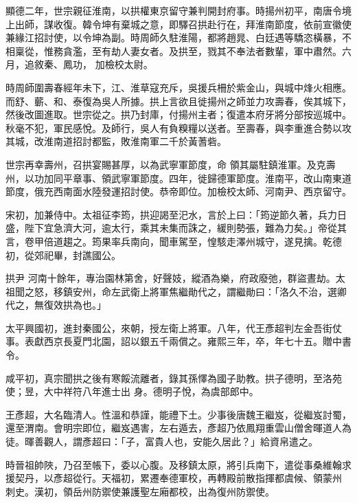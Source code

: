\begin{pinyinscope}
 顯德二年，世宗親征淮南，以拱權東京留守兼判開封府事。時揚州初平，南唐令境上出師，謀收復。韓令坤有棄城之意，即驛召拱赴行在，拜淮南節度，依前宣徽使兼緣江招討使，以令坤為副。時周師久駐淮陽，都將趙晁、白廷遇等驕恣橫暴，不相稟從，惟務貪濫，至有劫人妻女者。及拱至，戮其不奉法者數輩，軍中肅然。六月，追敘秦、鳳功，
 加檢校太尉。



 時周師圍壽春經年未下，江、淮草寇充斥，吳援兵柵於紫金山，與城中烽火相應。而舒、蘄、和、泰復為吳人所據。拱上言欲且徙揚州之師並力攻壽春，俟其城下，然後改圖進取。世宗從之。拱乃封庫，付揚州主者；復遣本府牙將分部按巡城中。秋毫不犯，軍民感悅。及師行，吳人有負糗糧以送者。至壽春，與李重進合勢以攻其城，改淮南道招討都監，敗淮南軍二千於黃蓍砦。



 世宗再幸壽州，召拱宴賜甚厚，以為武寧軍節度，命
 領其屬駐鎮淮軍。及克壽州，以功加同平章事、領武寧軍節度。四年，徙歸德軍節度。淮南平，改山南東道節度，俄充西南面水陸發運招討使。恭帝即位。加檢校太師、河南尹、西京留守。



 宋初，加兼侍中。太祖征李筠，拱迎謁至汜水，言於上曰：「筠逆節久著，兵力日盛，陛下宜急濟大河，逾太行，乘其未集而誅之，緩則勢張，難為力矣。」帝從其言，卷甲倍道趨之。筠果率兵南向，聞車駕至，惶駭走澤州城守，遂見擒。乾德初，從郊祀畢，封譙國公。



 拱尹
 河南十餘年，專治園林第舍，好聲妓，縱酒為樂，府政廢弛，群盜晝劫。太祖聞之怒，移鎮安州，命左武衛上將軍焦繼勛代之，謂繼勛曰：「洛久不治，選卿代之，無復效拱為也。」



 太平興國初，進封秦國公，來朝，授左衛上將軍。八年，代王彥超判左金吾街仗事。表獻西京長夏門北園，詔以銀五千兩償之。雍熙三年，卒，年七十五。贈中書令。



 咸平初，真宗聞拱之後有寒餒流離者，錄其孫懌為國子助教。拱子德明，至洛苑使；昱，大中祥符八年進士出
 身。德明子悅，為虞部郎中。



 王彥超，大名臨清人。性溫和恭謹，能禮下土。少事後唐魏王繼岌，從繼岌討蜀，還至渭南。會明宗即位，繼岌遇害，左右遁去，彥超乃依鳳翔重雲山僧舍暉道人為徒。暉善觀人，謂彥超曰：「子，富貴人也，安能久居此？」給資帛遣之。



 時晉祖帥陜，乃召至帳下，委以心腹。及移鎮太原，將引兵南下，遣從事桑維翰求援契丹，以彥超從行。天福初，累遷奉德軍校，再轉殿前散指揮都虞候、領蒙州
 刺史。漢初，領岳州防禦使兼護聖左廂都校，出為復州防禦使。




\end{pinyinscope}
